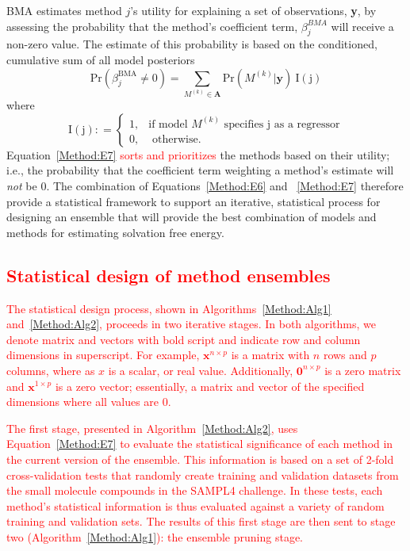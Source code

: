 \documentclass[journal=jpcbfk, manuscript=article]{achemso}
\newcommand{\+}[1]{\ensuremath{\mathbf{#1}}}
\newcommand{\rev}[1]{\textsf{\textcolor{red}{#1}}}
\begin{document}
BMA estimates method $j$'s utility for explaining a set of observations, \textbf{y}, by assessing the probability that the method's coefficient term, $\beta^{BMA}_j$ will receive a non-zero value.
The estimate of this probability is based on the conditioned, cumulative sum of all model posteriors
\begin{equation} \label{Method:E7} 
	\mathrm{Pr}(\beta_j^{\text{BMA}}\neq 0) =   \sum_{M^{(k)}\in\mathbf{A}} {\mathrm{Pr}}(M^{(k)} | \textbf{y}) \:{\mathrm{I(j)}}
\end{equation}
where
\begin{equation} \label{eq:bma-prob-neq0-ID}
	\mathrm{I(j)}: =
	\begin{cases} 
		1,&\text{if model $M^{(k)}$ specifies j as a regressor} \\
		0,&\text{ otherwise}.
	\end{cases}
\end{equation}
Equation~\ref{Method:E7} \rev{sorts and prioritizes} the methods based on their utility; i.e., the probability that the coefficient term weighting a method's estimate will \emph{not} be 0.
The combination of Equations~\ref{Method:E6} and ~\ref{Method:E7} therefore provide a statistical framework to support an iterative, statistical process for designing an ensemble that will provide the best combination of models and methods for estimating solvation free energy.

\subsection{\rev{Statistical design of method ensembles}}
 \label{Method:StatEnsemble:Design}
\rev{The statistical design process, shown in Algorithms~\ref{Method:Alg1} and~\ref{Method:Alg2}, proceeds in two iterative stages. 
In both algorithms, we denote matrix and vectors with bold script and indicate row and column dimensions in superscript.
For example, $\textbf{x}^{n \times p}$ is a matrix with $n$ rows and $p$ columns, where as $x$ is a scalar, or real value.
Additionally,  $\textbf{0}^{n \times p}$ is a zero matrix and  $\textbf{x}^{1 \times p}$ is a zero vector; essentially, a matrix and vector of the specified dimensions where all values are 0.}

\rev{The first stage, presented in Algorithm~\ref{Method:Alg2}, uses Equation~\ref{Method:E7} to evaluate the statistical significance of each method in the current version of the ensemble.
This information is based on a set of 2-fold cross-validation tests that randomly create training and validation datasets from the small molecule compounds  in the SAMPL4 challenge.
In these tests, each method's statistical information is thus evaluated against a variety of random training and validation sets.
The results of this first stage are then sent to stage two (Algorithm~\ref{Method:Alg1}): the ensemble pruning stage.}
\end{document}
